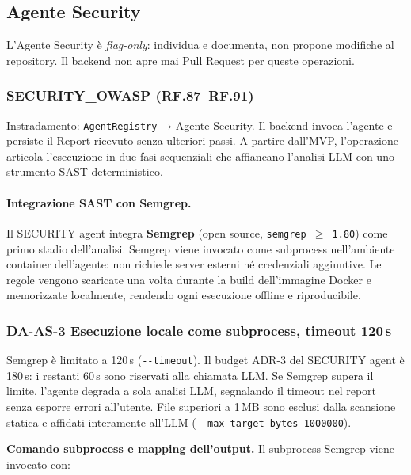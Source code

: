 \documentclass[11pt,a4paper]{article}
\begin{document}
\subsection{Agente Security}
\label{sec:be-agente-security}

L'Agente Security è \emph{flag-only}: individua e documenta, non propone modifiche al repository. Il backend non apre mai Pull Request per queste operazioni.

\subsubsection{SECURITY\_OWASP (RF.87--RF.91)}
\label{sec:be-security-owasp}

Instradamento: \texttt{AgentRegistry} → Agente Security. Il backend invoca l'agente e persiste il Report ricevuto senza ulteriori passi. A partire dall'MVP, l'operazione articola l'esecuzione in due fasi sequenziali che affiancano l'analisi LLM con uno strumento SAST deterministico.

\paragraph{Integrazione SAST con Semgrep.}

Il SECURITY agent integra \textbf{Semgrep} (open source, \texttt{semgrep $\geq$ 1.80}) come primo stadio dell'analisi. Semgrep viene invocato come subprocess nell'ambiente container dell'agente: non richiede server esterni né credenziali aggiuntive. Le regole vengono scaricate una volta durante la build dell'immagine Docker e memorizzate localmente, rendendo ogni esecuzione offline e riproducibile.

\subsubsection*{DA-AS-3 \textemdash{} Esecuzione locale come subprocess, timeout 120\,s}
Semgrep è limitato a 120\,s (\texttt{-{}-timeout}). Il budget ADR-3 del SECURITY agent è 180\,s: i restanti 60\,s sono riservati alla chiamata LLM. Se Semgrep supera il limite, l'agente degrada a sola analisi LLM, segnalando il timeout nel report senza esporre errori all'utente. File superiori a 1\,MB sono esclusi dalla scansione statica e affidati interamente all'LLM (\texttt{-{}-max-target-bytes 1000000}).

\medskip
\noindent\textbf{Comando subprocess e mapping dell'output.} Il subprocess Semgrep viene invocato con:
\end{document}
